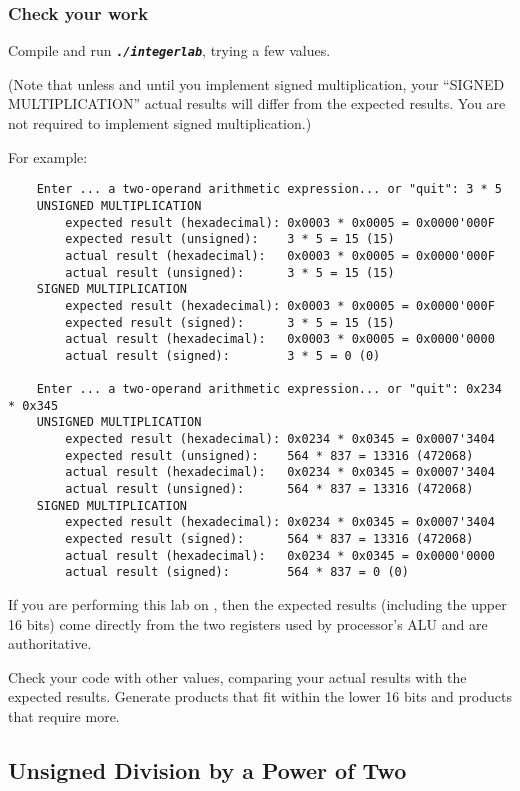 \subsubsection*{Check your work}

Compile and run \texttt{\textbf{\textit{./integerlab}}}, trying a few values.

(Note that unless and until you implement signed multiplication, your ``SIGNED MULTIPLICATION'' actual results will differ from the expected results.
You are not required to implement signed multiplication.)

For example:
\begin{verbatim}
    Enter ... a two-operand arithmetic expression... or "quit": 3 * 5
    UNSIGNED MULTIPLICATION
        expected result (hexadecimal): 0x0003 * 0x0005 = 0x0000'000F
        expected result (unsigned):    3 * 5 = 15 (15)
        actual result (hexadecimal):   0x0003 * 0x0005 = 0x0000'000F
        actual result (unsigned):      3 * 5 = 15 (15)
    SIGNED MULTIPLICATION
        expected result (hexadecimal): 0x0003 * 0x0005 = 0x0000'000F
        expected result (signed):      3 * 5 = 15 (15)
        actual result (hexadecimal):   0x0003 * 0x0005 = 0x0000'0000
        actual result (signed):        3 * 5 = 0 (0)

    Enter ... a two-operand arithmetic expression... or "quit": 0x234 * 0x345
    UNSIGNED MULTIPLICATION
        expected result (hexadecimal): 0x0234 * 0x0345 = 0x0007'3404
        expected result (unsigned):    564 * 837 = 13316 (472068)
        actual result (hexadecimal):   0x0234 * 0x0345 = 0x0007'3404
        actual result (unsigned):      564 * 837 = 13316 (472068)
    SIGNED MULTIPLICATION
        expected result (hexadecimal): 0x0234 * 0x0345 = 0x0007'3404
        expected result (signed):      564 * 837 = 13316 (472068)
        actual result (hexadecimal):   0x0234 * 0x0345 = 0x0000'0000
        actual result (signed):        564 * 837 = 0 (0)
\end{verbatim}

If you are performing this lab on \runtimeenvironment, then the expected results (including the upper 16 bits) come directly from the two registers used by processor's ALU and are authoritative.

Check your code with other values, comparing your actual results with the expected results.
Generate products that fit within the lower 16 bits and products that require more.


\subsection{Unsigned Division by a Power of Two}

